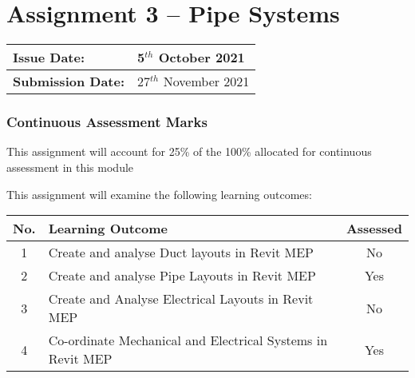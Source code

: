 
	
\part*{Assignment 3 – Pipe Systems}

\begin{tabularx}{\textwidth}{ |X|X| }
	\hline
	\textbf{Issue Date:} & 5$^{th}$ October 2021 \\
	\hline 
	\textbf{Submission Date:}  & 27$^{th}$ November 2021   \\
	\hline
\end{tabularx}


\section*{Continuous Assessment Marks}
This assignment will account for 25\% of the 100\% allocated for continuous assessment in this module

This assignment will examine the following learning outcomes:\\

\begin{tabularx}{\textwidth}{ |c|X|c| }
	\hline
	\textbf{No.} & \textbf{Learning Outcome} & \textbf{Assessed} \\
	\hline 
	1  & Create and analyse Duct layouts in Revit MEP & No \\
	2  & Create and analyse Pipe Layouts in Revit MEP & Yes \\
	3  & Create and Analyse Electrical Layouts in Revit MEP & No \\
	4  & Co-ordinate Mechanical and Electrical Systems in Revit MEP & Yes \\
	\hline
\end{tabularx}



